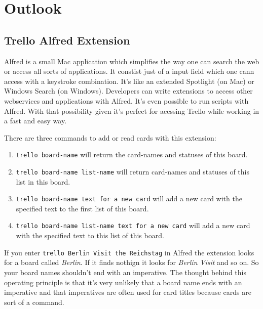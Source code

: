 \onehalfspacing
\chapter{Outlook}
  \label{Outlook}

\section{Trello Alfred Extension}

Alfred \cite{alfred} is a small Mac application which simplifies the way one can search the web or access all sorts of applications. It constist just of a input field which one cann access with a keystroke combination. It's like an extended Spotlight (on Mac) or Windows Search (on Windows). Developers can write extensions to access other webservices and applications with Alfred. It's even possible to run scripts with Alfred. With that possibility given it's perfect for acessing Trello while working in a fast and easy way. 



There are three commands to add or read cards with this extension:

\begin{enumerate}
	\item \texttt{trello board-name} will return the card-names and statuses of this board.
	\item \texttt{trello board-name list-name} will return card-names and statuses of this list in this board.
	\item \texttt{trello board-name text for a new card} will add a new card with the specified text to the first list of this board.
	\item \texttt{trello board-name list-name text for a new card} will add a new card with the specified text to this list of this board.
\end{enumerate}

If you enter \texttt{trello Berlin Visit the Reichstag} in Alfred the extension looks for a board called \emph{Berlin}. If it finds nothign it looks for \emph{Berlin Visit} and so on. So your board names shouldn't end with an imperative. The thought behind this operating principle is that it's very unlikely that a board name ends with an imperative and that imperatives are often used for card titles because cards are sort of a command.

